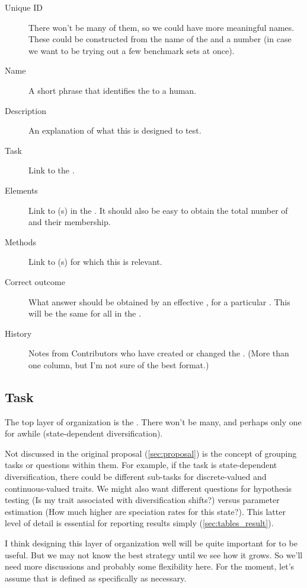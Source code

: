 \begin{description}
    \item[Unique ID] There won't be many of them, so we could have more meaningful names.  These could be constructed from the name of the \Task and a number (in case we want to be trying out a few benchmark sets at once).
    \item[Name] A short phrase that identifies the \Benchmark to a human.
    \item[Description] An explanation of what this \Benchmark is designed to test.
    \item[Task] Link to the \Task.
    \item[Elements] Link to \Element(s) in the \Benchmark.  It should also be easy to obtain the total number of \Elements and their \Refset membership.
    \item[Methods] Link to \Method(s) for which this \Benchmark is relevant.
    \item[Correct outcome] What answer should be obtained by an effective \Method, for a particular \Task.  This will be the same for all \Elements in the \Benchmark.
    \item[History] Notes from Contributors who have created or changed the \Benchmark.  (More than one column, but I'm not sure of the best format.)
\end{description}

\subsection{Task}
\label{sec:tables_task}

The top layer of organization is the \Task.
There won't be many, and perhaps only one for awhile (\ie state-dependent diversification).

Not discussed in the original proposal (\cref{sec:proposal}) is the concept of grouping tasks or questions within them.
For example, if the task is state-dependent diversification, there could be different sub-tasks for discrete-valued and continuous-valued traits.
We might also want different questions for hypothesis testing (Is my trait associated with diversification shifts?) versus parameter estimation (How much higher are speciation rates for this state?).
This latter level of detail is essential for reporting results simply (\cref{sec:tables_result}).

I think designing this layer of organization well will be quite important for \phycomb to be useful.
But we may not know the best strategy until we see how it grows.
So we'll need more discussions and probably some flexibility here.
For the moment, let's assume that \Task is defined as specifically as necessary.

